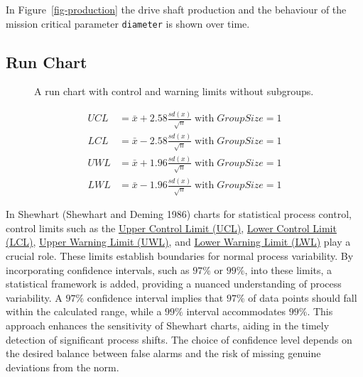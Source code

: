 \documentclass[
  a4paper,
]{scrbook}
\begin{document}
In Figure~\ref{fig-production} the drive shaft production and the
behaviour of the mission critical parameter \texttt{diameter} is shown
over time.

\subsection{Run Chart}\label{run-chart}

\begin{figure}[H]


\caption{\label{fig-run-chart}A run chart with control and warning
limits without subgroups.}

\end{figure}%

\begin{align}
UCL &= \bar{x} + 2.58\frac{sd(x)}{\sqrt{n}} \;\text{with}\;GroupSize=1 \\
LCL &= \bar{x} - 2.58\frac{sd(x)}{\sqrt{n}} \;\text{with}\;GroupSize=1 \\
UWL &= \bar{x} + 1.96\frac{sd(x)}{\sqrt{n}} \;\text{with}\;GroupSize=1 \\
LWL &= \bar{x} - 1.96\frac{sd(x)}{\sqrt{n}} \;\text{with}\;GroupSize=1
\end{align}

In Shewhart (Shewhart and Deming 1986) charts for statistical process
control, control limits such as the \hyperref[UCL]{Upper Control Limit
(UCL)}, \hyperref[LCL]{Lower Control Limit (LCL)}, \hyperref[UWL]{Upper
Warning Limit (UWL)}, and \hyperref[LWL]{Lower Warning Limit (LWL)} play
a crucial role. These limits establish boundaries for normal process
variability. By incorporating confidence intervals, such as \(97\%\) or
\(99\%\), into these limits, a statistical framework is added, providing
a nuanced understanding of process variability. A \(97\%\) confidence
interval implies that \(97\%\) of data points should fall within the
calculated range, while a \(99\%\) interval accommodates \(99\%\). This
approach enhances the sensitivity of Shewhart charts, aiding in the
timely detection of significant process shifts. The choice of confidence
level depends on the desired balance between false alarms and the risk
of missing genuine deviations from the norm.
\end{document}
